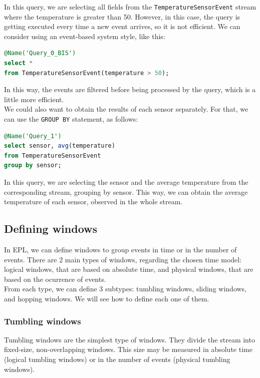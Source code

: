 In this query, we are selecting all fields from the \texttt{TemperatureSensorEvent}
stream where the temperature is greater than 50. However, in this case, the query is 
getting executed every time a new event arrives, so it is not efficient. We can consider
using an event-based system style, like this:\\

\begin{lstlisting}[language=SQL]
@Name('Query_0_BIS')
select *
from TemperatureSensorEvent(temperature > 50);
\end{lstlisting}

In this way, the events are filtered before being processed by the query, which is
a little more efficient. \\

We could also want to obtain the results of each sensor separately. For that, we
can use the \texttt{GROUP BY} statement, as follows:\\

\begin{lstlisting}[language=SQL]
@Name('Query_1')
select sensor, avg(temperature)
from TemperatureSensorEvent
group by sensor;
\end{lstlisting}

In this query, we are selecting the sensor and the average temperature from the
corresponding stream, grouping by sensor. This way, we can obtain the average
temperature of each sensor, observed in the whole stream.

\subsection{Defining windows}

In EPL, we can define windows to group events in time or in the number of events.
There are 2 main types of windows, regarding the chosen time model: logical windows, 
that are based on absolute time, and physical windows, that are based on the 
ocurrence of events.\\

From each type, we can define 3 subtypes: tumbling windows, sliding windows, and
hopping windows. We will see how to define each one of them.

\subsubsection{Tumbling windows}

Tumbling windows are the simplest type of windows. They divide the stream into
fixed-size, non-overlapping windows. This size may be measured in absolute time
(logical tumbling windows) or in the number of events (physical tumbling windows).\\

